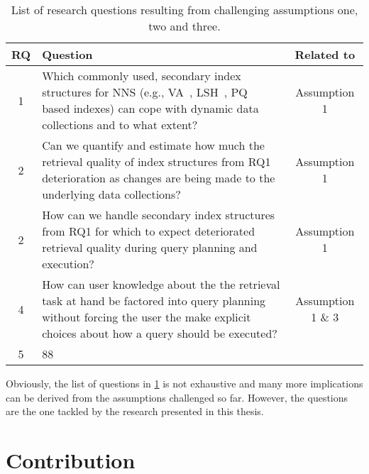 \begin{table}[h!]
    \centering
    \caption{List of research questions resulting from challenging assumptions one, two and three.}
    \begin{tabular}{|c|p{10cm}|c|} 
     \hline
     \textbf{RQ} & \textbf{Question} & \textbf{Related to} \\ [0.5ex] 
     \hline\hline
     1 & Which commonly used, secondary index structures for NNS (e.g., VA~\cite{Weber:1998va}, LSH~\cite{Indyk:1998lsh}, PQ~\cite{jegou:2011pq} based indexes) can cope with dynamic data collections and to what extent? & Assumption 1\\ 
     2 & Can we quantify and estimate how much the retrieval quality of index structures from RQ1 deterioration as changes are being made to the underlying data collections? & Assumption 1 \\ 
     2 & How can we handle secondary index structures from RQ1 for which to expect deteriorated retrieval quality during query planning and execution? & Assumption 1 \\
     4 & How can user knowledge about the the retrieval task at hand be factored into query planning without forcing the user the make explicit choices about how a query should be executed? & Assumption 1 \& 3 \\
     5 & 88 & \\ 
     \hline
    \end{tabular}
    \label{table:research_questions}
\end{table}

Obviously, the list of questions in \cref{table:research_questions} is not exhaustive and many more implications can be derived from the assumptions challenged so far. However, the questions are the one tackled by the research presented in this thesis.


\section{Contribution}

